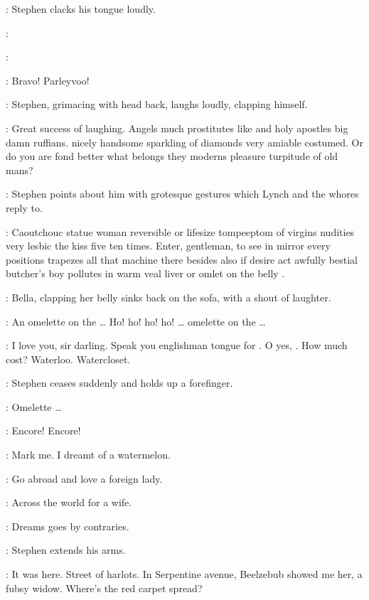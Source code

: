 :
Stephen clacks his tongue loudly.

\Stephen:

\Lynch:

\Whores:
Bravo!
Parleyvoo!

:
Stephen, grimacing with head back, laughs loudly, clapping himself.

\Stephen:
Great success of laughing.
Angels much prostitutes like and holy apostles big damn ruffians.
 nicely handsome sparkling of diamonds very amiable costumed.
Or do you are fond better what belongs they
moderns pleasure turpitude of old mans?

:
Stephen points about him with grotesque gestures which Lynch and the whores reply to.

\Stephen:
Caoutchouc statue woman reversible or lifesize tompeeptom of virgins nudities
very lesbic the kiss five ten times.
Enter, gentleman, to see in mirror every positions trapezes
all that machine there besides also if desire act
awfully bestial butcher's boy pollutes in warm veal liver
or omlet on the belly .

:
Bella, clapping her belly sinks back on the sofa, with a shout of laughter.

\Bella:
An omelette on the \ldots
Ho! ho! ho! ho! \ldots
omelette on the \ldots

\Stephen:
I love you, sir darling.
Speak you englishman tongue for .
O yes, .
How much cost?
Waterloo.
Watercloset.

:
Stephen ceases suddenly and holds up a forefinger.

\Bella:
Omelette \ldots

\Whores:
Encore! Encore!

\Stephen:
Mark me.
I dreamt of a watermelon.

\Zoe:
Go abroad and love a foreign lady.

\Lynch:
Across the world for a wife.

\Florry:
Dreams goes by contraries.

:
Stephen extends his arms.

\Stephen:
It was here.
Street of harlots.
In Serpentine avenue, Beelzebub showed me her, a fubsy widow.
Where's the red carpet spread?

